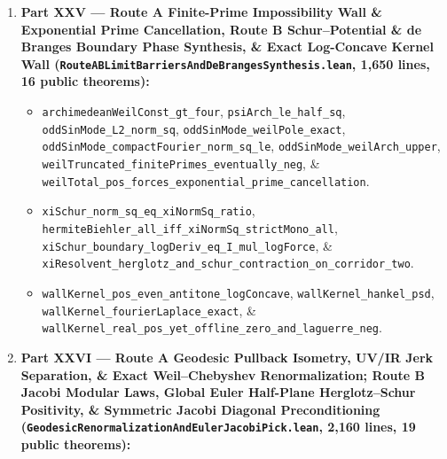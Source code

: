 \documentclass[
  11pt,
]{article}
\providecommand{\tightlist}{%
  \setlength{\itemsep}{0pt}\setlength{\parskip}{0pt}}
\begin{document}
\begin{enumerate}
  \begin{itemize}
  \tightlist
  \item
    \texttt{tanh\_abs\_lt\_one}, \texttt{artanh\_tanh\_eq},
    \texttt{tanh\_artanh\_eq}, \texttt{hasDerivAt\_artanh},
    \texttt{hasDerivAt\_binEntropy},
    \texttt{artanh\_mul\_sub\_sq\_ge\_quartic},
    \texttt{binEntropy\_sub\_half\_sq\_ge\_quartic}, \&
    \texttt{binEntropy\_bregman\_ge\_half\_sq}.
  \item
    \texttt{universalSolver\_exact\_lyapunov\_descent},
    \texttt{universalSolver\_neg\_witness\_of\_nonzero\_fixedPoint},
    \texttt{universalSolver\_unique\_zero\_of\_psd},
    \texttt{universalSolver\_psd\_iff\_freeEnergy\_nonneg},
    \texttt{adaptiveResolventUniversal\_neg\_witness\_and\_unique\_zero},
    \& \texttt{adaptiveResolventUniversal\_unique\_zero\_of\_psd}.
  \item
    \texttt{xiResolvent\_eq\_explicit\_vonMangoldt\_of\_half\_lt\_im} \&
    \texttt{universalSolver\_realLifted\_pick\_iff\_hermitian\_psd}.
  \end{itemize}
\item
  \textbf{Part XXV --- Route A Finite-Prime Impossibility Wall \&
  Exponential Prime Cancellation, Route B Schur--Potential \& de Branges
  Boundary Phase Synthesis, \& Exact Log-Concave Kernel Wall
  (\texttt{RouteABLimitBarriersAndDeBrangesSynthesis.lean}, 1,650 lines,
  16 public theorems):}

  \begin{itemize}
  \tightlist
  \item
    \texttt{archimedeanWeilConst\_gt\_four},
    \texttt{psiArch\_le\_half\_sq}, \texttt{oddSinMode\_L2\_norm\_sq},
    \texttt{oddSinMode\_weilPole\_exact},
    \texttt{oddSinMode\_compactFourier\_norm\_sq\_le},
    \texttt{oddSinMode\_weilArch\_upper},
    \texttt{weilTruncated\_finitePrimes\_eventually\_neg}, \&
    \texttt{weilTotal\_pos\_forces\_exponential\_prime\_cancellation}.
  \item
    \texttt{xiSchur\_norm\_sq\_eq\_xiNormSq\_ratio},
    \texttt{hermiteBiehler\_all\_iff\_xiNormSq\_strictMono\_all},
    \texttt{xiSchur\_boundary\_logDeriv\_eq\_I\_mul\_logForce}, \&
    \texttt{xiResolvent\_herglotz\_and\_schur\_contraction\_on\_corridor\_two}.
  \item
    \texttt{wallKernel\_pos\_even\_antitone\_logConcave},
    \texttt{wallKernel\_hankel\_psd},
    \texttt{wallKernel\_fourierLaplace\_exact}, \&
    \texttt{wallKernel\_real\_pos\_yet\_offline\_zero\_and\_laguerre\_neg}.
  \end{itemize}
\item
  \textbf{Part XXVI --- Route A Geodesic Pullback Isometry, UV/IR Jerk
  Separation, \& Exact Weil--Chebyshev Renormalization; Route B Jacobi
  Modular Laws, Global Euler Half-Plane Herglotz--Schur Positivity, \&
  Symmetric Jacobi Diagonal Preconditioning
  (\texttt{GeodesicRenormalizationAndEulerJacobiPick.lean}, 2,160 lines,
  19 public theorems):}


\end{enumerate}
\end{document}
